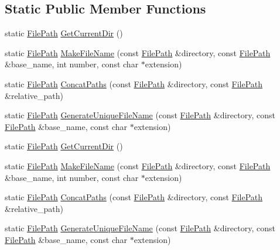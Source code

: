 \subsection*{Static Public Member Functions}
\begin{DoxyCompactItemize}
\item 
static \hyperlink{classtesting_1_1internal_1_1_file_path}{File\-Path} \hyperlink{classtesting_1_1internal_1_1_file_path_aaff39ccd7bfb7a1c09c0220a64326387}{Get\-Current\-Dir} ()
\item 
static \hyperlink{classtesting_1_1internal_1_1_file_path}{File\-Path} \hyperlink{classtesting_1_1internal_1_1_file_path_aa8c102da670261eb4fa8e2f2481df139}{Make\-File\-Name} (const \hyperlink{classtesting_1_1internal_1_1_file_path}{File\-Path} \&directory, const \hyperlink{classtesting_1_1internal_1_1_file_path}{File\-Path} \&base\-\_\-name, int number, const char $\ast$extension)
\item 
static \hyperlink{classtesting_1_1internal_1_1_file_path}{File\-Path} \hyperlink{classtesting_1_1internal_1_1_file_path_ac9d57987f60ac43f0c57b89e333e531e}{Concat\-Paths} (const \hyperlink{classtesting_1_1internal_1_1_file_path}{File\-Path} \&directory, const \hyperlink{classtesting_1_1internal_1_1_file_path}{File\-Path} \&relative\-\_\-path)
\item 
static \hyperlink{classtesting_1_1internal_1_1_file_path}{File\-Path} \hyperlink{classtesting_1_1internal_1_1_file_path_a2280a77adb394cf80bb5f73fc292e8c8}{Generate\-Unique\-File\-Name} (const \hyperlink{classtesting_1_1internal_1_1_file_path}{File\-Path} \&directory, const \hyperlink{classtesting_1_1internal_1_1_file_path}{File\-Path} \&base\-\_\-name, const char $\ast$extension)
\item 
static \hyperlink{classtesting_1_1internal_1_1_file_path}{File\-Path} \hyperlink{classtesting_1_1internal_1_1_file_path_a0f7b48e493656679cb82a2b679620c4e}{Get\-Current\-Dir} ()
\item 
static \hyperlink{classtesting_1_1internal_1_1_file_path}{File\-Path} \hyperlink{classtesting_1_1internal_1_1_file_path_a1e7793eaae21c6629afe8be11064b111}{Make\-File\-Name} (const \hyperlink{classtesting_1_1internal_1_1_file_path}{File\-Path} \&directory, const \hyperlink{classtesting_1_1internal_1_1_file_path}{File\-Path} \&base\-\_\-name, int number, const char $\ast$extension)
\item 
static \hyperlink{classtesting_1_1internal_1_1_file_path}{File\-Path} \hyperlink{classtesting_1_1internal_1_1_file_path_ad58aa6d8b160d0ba0b661f56f0980e26}{Concat\-Paths} (const \hyperlink{classtesting_1_1internal_1_1_file_path}{File\-Path} \&directory, const \hyperlink{classtesting_1_1internal_1_1_file_path}{File\-Path} \&relative\-\_\-path)
\item 
static \hyperlink{classtesting_1_1internal_1_1_file_path}{File\-Path} \hyperlink{classtesting_1_1internal_1_1_file_path_ab22637ea53e3918ec814dc6a5fecd1f9}{Generate\-Unique\-File\-Name} (const \hyperlink{classtesting_1_1internal_1_1_file_path}{File\-Path} \&directory, const \hyperlink{classtesting_1_1internal_1_1_file_path}{File\-Path} \&base\-\_\-name, const char $\ast$extension)
\end{DoxyCompactItemize}


